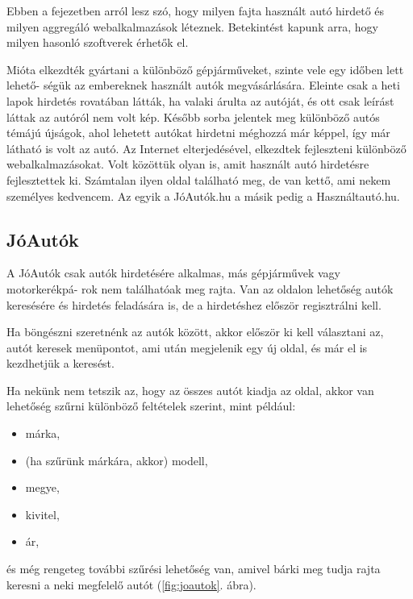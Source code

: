
Ebben a fejezetben arról lesz szó, hogy milyen fajta használt autó hirdető és milyen aggregáló webalkalmazások léteznek. Betekintést kapunk arra, hogy milyen hasonló szoftverek érhetők el.


Mióta elkezdték gyártani a különböző gépjárműveket, szinte vele egy időben lett lehető-
ségük az embereknek használt autók megvásárlására. Eleinte csak a heti lapok hirdetés rovatában látták, ha valaki árulta az autóját, és ott csak leírást láttak az autóról nem volt kép. Később sorba jelentek meg különböző autós témájú újságok, ahol lehetett autókat hirdetni méghozzá már képpel, így már látható is volt az autó. 
Az Internet elterjedésével, elkezdtek fejleszteni különböző webalkalmazásokat. Volt közöttük olyan is, amit használt autó hirdetésre fejlesztettek ki. Számtalan ilyen oldal található meg, de van kettő, ami nekem személyes kedvencem. Az egyik a JóAutók.hu a másik pedig a Használtautó.hu.

\subsection{JóAutók}
A JóAutók \cite{JoAuto} csak autók hirdetésére alkalmas, más gépjárművek vagy motorkerékpá-
rok nem találhatóak meg rajta. Van az oldalon lehetőség autók keresésére és hirdetés feladására is, de a hirdetéshez először regisztrálni kell.

Ha böngészni szeretnénk az autók között, akkor először ki kell választani az, autót keresek menüpontot, ami után megjelenik egy új oldal, és már el is kezdhetjük a keresést.

Ha nekünk nem tetszik az, hogy az összes autót kiadja az oldal, akkor van lehetőség szűrni különböző feltételek szerint, mint például:
\begin{itemize}
\item márka,
\item (ha szűrünk márkára, akkor) modell,
\item megye,
\item kivitel,
\item ár,
\end{itemize}és még rengeteg további szűrési lehetőség van, amivel bárki meg tudja rajta keresni a neki megfelelő autót (\ref{fig:joautok}. ábra).

